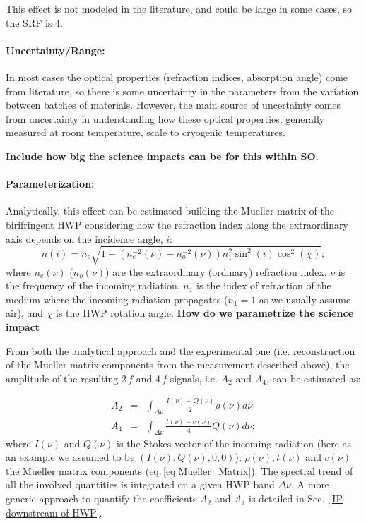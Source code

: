 This effect is not modeled in the literature, and could be large in some cases, so the SRF is 4.

\paragraph{Uncertainty/Range:}
In most cases the optical properties (refraction indices, absorption angle) come from literature, so there is some uncertainty in the parameters from the variation between batches of materials. However, the main source of uncertainty comes from uncertainty in understanding how these optical properties, generally measured at room temperature, scale to cryogenic temperatures.

\textbf{Include how big the science impacts can be for this within SO.}

\paragraph{Parameterization:}
Analytically, this effect can be estimated building the Mueller matrix of the birifringent HWP considering how the refraction index along the extraordinary axis depends on the incidence angle, $i$:
\begin{equation}
n(i)=n_e\sqrt{1+(n_e^{-2}(\nu)-n_o^{-2}(\nu))n_1^2\sin^2(i)\cos^2(\chi)};
\end{equation}
where $n_e(\nu)$ ($n_o(\nu)$) are the extraordinary (ordinary) refraction index, $\nu$ is the frequency of the incoming radiation, $n_1$ is the index of refraction of the medium where the incoming radiation propagates ($n_1=1$ as we usually assume air), and $\chi$ is the HWP rotation angle. \textbf{How do we parametrize the science impact}

From both the analytical approach and the experimental one (i.e. reconstruction of the Mueller matrix components from the measurement described above), the amplitude of the resulting 2$\,f$ and 4$\,f$ signals, i.e. $A_2$ and $A_4$, can be estimated as:

\begin{eqnarray}
  A_2 &=& \int_{\Delta\nu} \frac{I(\nu)+Q(\nu)}{2} \rho(\nu) d\nu\\ \label{A2}
  A_4 &=& \int_{\Delta\nu} \frac{t(\nu)-c(\nu)}{4} Q(\nu) d\nu; \label{A4}
\end{eqnarray}
where $I(\nu)$ and $Q(\nu)$ is the Stokes vector of the incoming radiation (here as an example we assumed to be $(I(\nu), Q(\nu),0,0)$),
$\rho(\nu), t(\nu)$ and $c(\nu)$ the Mueller matrix components (eq.\,\ref{eq:Mueller_Matrix}). The spectral trend of all the involved quantities is integrated on a given HWP band $\Delta\nu$. A more generic approach to quantify the coefficients $A_2$ and $A_4$ is detailed in Sec.~\ref{IP downstream of HWP}.



